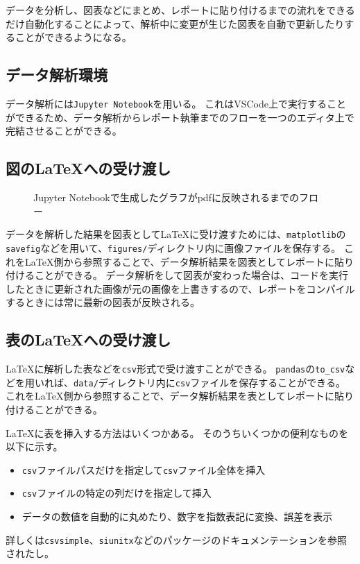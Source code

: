 データを分析し、図表などにまとめ、レポートに貼り付けるまでの流れをできるだけ自動化することによって、解析中に変更が生じた図表を自動で更新したりすることができるようになる。

\subsection{データ解析環境}

データ解析には\verb|Jupyter Notebook|を用いる。
これはVSCode上で実行することができるため、データ解析からレポート執筆までのフローを一つのエディタ上で完結させることができる。


\subsection{図の\LaTeX への受け渡し}

\begin{figure}[htbp]
    \centering
    
    \caption{Jupyter Notebookで生成したグラフがpdfに反映されるまでのフロー}
    \label{fig:flow}
\end{figure}

データを解析した結果を図表として\LaTeX に受け渡すためには、\verb|matplotlib|の\verb|savefig|などを用いて、\verb|figures/|ディレクトリ内に画像ファイルを保存する。
これを\LaTeX 側から参照することで、データ解析結果を図表としてレポートに貼り付けることができる。
データ解析をして図表が変わった場合は、コードを実行したときに更新された画像が元の画像を上書きするので、レポートをコンパイルするときには常に最新の図表が反映される。

\subsection{表の\LaTeX への受け渡し}

\LaTeX に解析した表などを\verb|csv|形式で受け渡すことができる。
\verb|pandas|の\verb|to_csv|などを用いれば、\verb|data/|ディレクトリ内に\verb|csv|ファイルを保存することができる。
これを\LaTeX 側から参照することで、データ解析結果を表としてレポートに貼り付けることができる。

\LaTeX に表を挿入する方法はいくつかある。
そのうちいくつかの便利なものを以下に示す。
\begin{itemize}
    \item \verb|csv|ファイルパスだけを指定して\verb|csv|ファイル全体を挿入
    \item \verb|csv|ファイルの特定の列だけを指定して挿入
    \item データの数値を自動的に丸めたり、数字を指数表記に変換、誤差を表示
\end{itemize}
詳しくは\verb|csvsimple|、\verb|siunitx|などのパッケージのドキュメンテーションを参照されたし。

